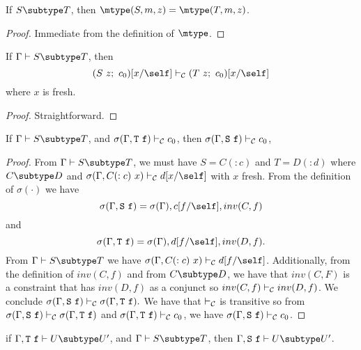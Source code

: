 \begin{lemma}
\label{lemmatwo} %
If   $S \subtype T$,
then $\mtype(S,m,z) = \mtype(T,m,z)$.
\end{lemma}

\begin{proof}
Immediate from the definition of $\mtype$.
\end{proof}

\begin{lemma}
\label{existential-subtyping}
If   $\Gamma \vdash S \subtype T$,
then $$(S~z;~c_0)[x/\self] \vdash_{\cal C} (T~z;~c_0)[x/\self]$$
where $x$ is fresh.
\end{lemma}

\begin{proof}
Straightforward.
\end{proof}

\begin{lemma}
\label{lemmafour} %
If   $\Gamma \vdash S \subtype T$,
and  $\sigma(\Gamma,{\tt T}\ {\tt f}) \vdash_{\cal C} c_0$,
then $\sigma(\Gamma,{\tt S}\ {\tt f}) \vdash_{\cal C} c_0$,
\end{lemma}

\begin{proof}
From $\Gamma \vdash S \subtype T$,
we must have $S = C(:c)$ and $T = D(:d)$
where
$C \subtype D$
and
$\sigma(\Gamma, C(:c)~x) \vdash_{\cal C} d[x/\self]$
with $x$ fresh.
From the definition of $\sigma(\cdot)$ we have
    $$\sigma(\Gamma,{\tt S}\ {\tt f}) = \sigma(\Gamma), c[f/\self], inv(C,f)$$
and $$\sigma(\Gamma,{\tt T}\ {\tt f}) = \sigma(\Gamma), d[f/\self], inv(D,f).$$
From $\Gamma \vdash S \subtype T$ we have 
$\sigma(\Gamma, C(:c)~x) \vdash_{\cal C} d[f/\self]$.
Additionally, from the definition of $inv(C,f)$ and
from $C \subtype D$, 
we have that $inv(C,F)$ is a constraint that has $inv(D,f)$ as a conjunct so 
$inv(C,f) \vdash_{\cal C} inv(D,f)$.
We conclude
$\sigma(\Gamma,{\tt S}\ {\tt f}) \vdash_{\cal C}
\sigma(\Gamma,{\tt T}\ {\tt f}).$
We have that $\vdash_{\cal C}$ is transitive so 
from $\sigma(\Gamma,{\tt S}\ {\tt f}) \vdash_{\cal C}
\sigma(\Gamma,{\tt T}\ {\tt f})$
and
$\sigma(\Gamma,{\tt T}\ {\tt f}) \vdash_{\cal C} c_0$,
we have 
$\sigma(\Gamma,{\tt S}\ {\tt f}) \vdash_{\cal C} c_0$.
\end{proof}

\begin{lemma}
\label{lemmathree} %
if   $\Gamma, {\tt T}\ {\tt f} \vdash U \subtype U'$,
and  $\Gamma \vdash S \subtype T$,
then $\Gamma, {\tt S}\ {\tt f} \vdash U \subtype U'$.
\end{lemma}

